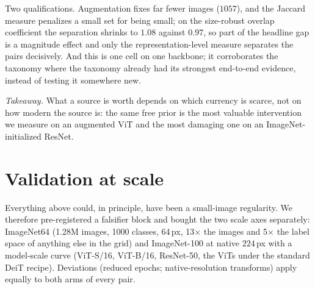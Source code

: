 Two qualifications. Augmentation fixes far fewer images ($1057$), and the
Jaccard measure penalizes a small set for being small; on the size-robust
overlap coefficient the separation shrinks to $1.08$ against $0.97$, so part of
the headline gap is a magnitude effect and only the representation-level
measure separates the pairs decisively. And this is one cell on one backbone;
it corroborates the taxonomy where the taxonomy already had its strongest
end-to-end evidence, instead of testing it somewhere new.

\emph{Takeaway.} What a source is worth depends on which currency is scarce,
not on how modern the source is: the same free prior is the most valuable
intervention we measure on an augmented ViT and the most damaging one on an
ImageNet-initialized ResNet.

\section{Validation at scale}\label{sec:scale}

Everything above could, in principle, have been a small-image regularity. We
therefore pre-registered a falsifier block and bought the two scale axes
separately: ImageNet64 (1.28M images, 1000 classes, 64\,px, 13$\times$ the
images and 5$\times$ the label space of anything else in the grid) and
ImageNet-100 at native $224$\,px with a model-scale curve (ViT-S/16, ViT-B/16,
ResNet-50, the ViTs under the standard DeiT recipe). Deviations (reduced
epochs; native-resolution transforms) apply equally to both arms of every pair.


